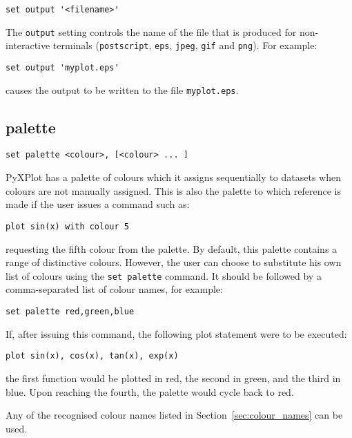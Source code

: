 \begin{verbatim}
set output '<filename>'
\end{verbatim}

The {\tt output} setting controls the name of the file that is produced for
non-interactive terminals ({\tt postscript}, {\tt eps}, {\tt jpeg}, {\tt gif}
and {\tt png}).  For example:

\begin{verbatim}
set output 'myplot.eps'
\end{verbatim}

\noindent causes the output to be written to the file {\tt myplot.eps}.


\subsection{palette}

\begin{verbatim}
set palette <colour>, [<colour> ... ]
\end{verbatim}

PyXPlot has a palette of colours which it assigns sequentially to datasets when
colours are not manually assigned. This is also the palette to which reference
is made if the user issues a command such as:

\begin{verbatim}
plot sin(x) with colour 5
\end{verbatim}

\noindent requesting the fifth colour from the palette. By default, this palette
contains a range of distinctive colours. However, the user can choose to
substitute his own list of colours using the {\tt set palette} command. It
should be followed by a comma-separated list of colour names, for example:

\begin{verbatim}
set palette red,green,blue
\end{verbatim}

If, after issuing this command, the following plot statement were to be
executed:

\begin{verbatim}
plot sin(x), cos(x), tan(x), exp(x)
\end{verbatim}

\noindent the first function would be plotted in red, the second in green, and the third
in blue. Upon reaching the fourth, the palette would cycle back to red.

Any of the recognised colour names listed in Section~\ref{sec:colour_names} can be used.

